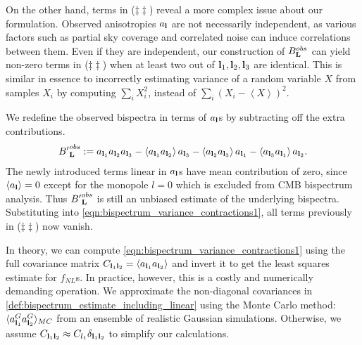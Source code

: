 On the other hand, terms in ($\ddagger\ddagger$) reveal a more complex issue about our formulation. Observed anisotropies $a_\mathbf{l}$ are not necessarily independent, as various factors such as partial sky coverage and correlated noise can induce correlations between them. Even if they are independent, our construction of $B^{obs}_\mathbf{L}$ can yield non-zero terms in ($\ddagger\ddagger$) when at least two out of $\mathbf{l}_1, \mathbf{l}_2, \mathbf{l}_3$ are identical. This is similar in essence to incorrectly estimating variance of a random variable $X$ from samples $X_i$ by computing $\sum_i X_i^2$, instead of $\sum_i (X_i- \left< X \right>)^2$.

We redefine the observed bispectra in terms of $a_\mathbf{l}$s by subtracting off the extra contributions.
\begin{align}
	{B'}^{obs}_\mathbf{L} := a_{\mathbf{l}_1} a_{\mathbf{l}_2} a_{\mathbf{l}_3} - \left< a_{\mathbf{l}_1} a_{\mathbf{l}_2} \right> a_{\mathbf{l}_3} - \left< a_{\mathbf{l}_2} a_{\mathbf{l}_3} \right> a_{\mathbf{l}_1} - \left< a_{\mathbf{l}_3} a_{\mathbf{l}_1} \right> a_{\mathbf{l}_2}. \label{def:bispectrum_estimate_including_linear}
\end{align}
The newly introduced terms linear in $a_\mathbf{l}$s have mean contribution of zero, since $\left< a_\mathbf{l} \right> = 0$ except for the monopole $l=0$ which is excluded from CMB bispectrum analysis. Thus ${B'}^{obs}_\mathbf{L}$ is still an unbiased estimate of the underlying bispectra. Substituting into \eqref{eqn:bispectrum_variance_contractions1}, all terms previously in ($\ddagger\ddagger$) now vanish.

In theory, we can compute \eqref{eqn:bispectrum_variance_contractions1} using the full covariance matrix $C_{\mathbf{l}_1 \mathbf{l}_2} = \left< a_{\mathbf{l}_1} a_{\mathbf{l}_2} \right>$ and invert it to get the least squares estimate for $f_{NL}$s. In practice, however, this is a costly and numerically demanding operation. We approximate the non-diagonal covariances in \eqref{def:bispectrum_estimate_including_linear} using the Monte Carlo method: $\langle a_{\mathbf{l}_1}^{G} a_{\mathbf{l}_2}^{G} \rangle_{MC}$ from an ensemble of realistic Gaussian simulations. Otherwise, we assume $C_{\mathbf{l}_1 \mathbf{l}_2} \approx C_{l_1} \delta_{\mathbf{l}_1 \mathbf{l}_2}$ to simplify our calculations.

